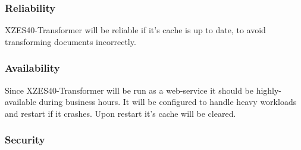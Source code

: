 
\subsubsection{Reliability}

XZES40-Transformer will be reliable if it's cache is up to date, to avoid transforming documents incorrectly.


\subsubsection{Availability}

Since XZES40-Transformer will be run as a web-service it should be highly-available during business hours.
It will be configured to handle heavy workloads and restart if it crashes.
Upon restart it's cache will be cleared.


\subsubsection{Security}

